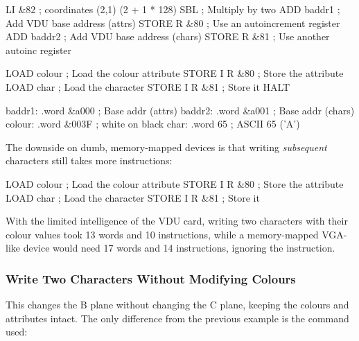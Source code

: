 \begin{cftasmcode}
         LI &82                      ; coordinates (2,1) (2 + 1 * 128)
         SBL                         ; Multiply by two
         ADD baddr1                  ; Add VDU base address (attrs)
         STORE R &80                 ; Use an autoincrement register
         ADD baddr2                  ; Add VDU base address (chars)
         STORE R &81                 ; Use another autoinc register

         LOAD colour                 ; Load the colour attribute
         STORE I R &80               ; Store the attribute
         LOAD char                   ; Load the character
         STORE I R &81               ; Store it
         HALT

baddr1:  .word &a000                 ; Base addr (attrs)
baddr2:  .word &a001                 ; Base addr (chars)
colour:  .word &003F                 ; white on black
char:    .word 65                    ; ASCII 65 ('A')
\end{cftasmcode}

\noindent The downside on dumb, memory-mapped devices is that writing {\em subsequent\/}
characters still takes more instructions:

\begin{cftasmcode}
         LOAD colour                 ; Load the colour attribute
         STORE I R &80               ; Store the attribute
         LOAD char                   ; Load the character
         STORE I R &81               ; Store it
\end{cftasmcode}

\noindent With the limited intelligence of the VDU card, writing two characters
with their colour values took 13 words and 10 instructions, while a
memory-mapped VGA-like device would need 17 words and 14 instructions, ignoring
the  instruction.



\subsubsection{Write Two Characters Without Modifying Colours}

This changes the B plane without changing the C plane, keeping the colours and
attributes intact. The only difference from the previous example is the command
used:



